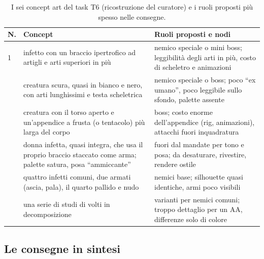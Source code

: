 \begin{table}[htbp]
  \centering
  \caption{I sei concept art del task T6 (ricostruzione del curatore) e i
  ruoli proposti più spesso nelle consegne.}
  \label{rv:t6:tab:concept}
  \small
  \begin{tabular}{@{}lp{5.6cm}p{5.2cm}@{}}
    \toprule
    \textbf{N.} & \textbf{Concept} & \textbf{Ruoli proposti e nodi} \\
    \midrule
    1 & infetto con un braccio ipertrofico ad artigli e arti superiori in più &
      nemico speciale o mini boss; leggibilità degli arti in più, costo di
      scheletro e animazioni \\
    \addlinespace
    2 & creatura scura, quasi in bianco e nero, con arti lunghissimi e testa
      scheletrica & nemico speciale o boss; poco ``ex umano'', poco leggibile
      sullo sfondo, palette assente \\
    \addlinespace
    3 & creatura con il torso aperto e un'appendice a frusta (o tentacolo) più
      larga del corpo & boss; costo enorme dell'appendice (rig,
      animazioni), attacchi fuori inquadratura \\
    \addlinespace
    4 & donna infetta, quasi integra, che usa il proprio braccio staccato come
      arma; palette satura, posa ``ammiccante'' & fuori dal mandate per tono e
      posa; da desaturare, rivestire, rendere ostile \\
    \addlinespace
    5 & quattro infetti comuni, due armati (ascia, pala), il quarto pallido e
      nudo & nemici base; silhouette quasi identiche, armi poco visibili \\
    \addlinespace
    6 & una serie di studi di volti in decomposizione & varianti per nemici
      comuni; troppo dettaglio per un AA, differenze solo di colore \\
    \bottomrule
  \end{tabular}
\end{table}

\subsection{Le consegne in sintesi}

